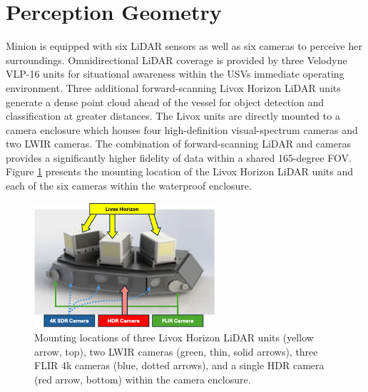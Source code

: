 \documentclass{erauthesis}
\begin{document}
\section{Perception Geometry} \label{perception_geometry}

Minion is equipped with six \ac{LiDAR} sensors as well as six cameras to perceive her surroundings.
Omnidirectional \ac{LiDAR} coverage is provided by three Velodyne VLP-16 units for situational awareness within the \acp{USV} immediate operating environment.
Three additional forward-scanning Livox Horizon \ac{LiDAR} units generate a dense point cloud ahead of the vessel for object detection and classification at greater distances.
The Livox units are directly mounted to a camera enclosure which houses four high-definition visual-spectrum cameras and two \ac{LWIR} cameras.
The combination of forward-scanning LiDAR and cameras provides a significantly higher fidelity of data within a shared 165-degree \ac{FOV}. %
Figure \ref{fig:camera_enclosure} presents the mounting location of the Livox Horizon LiDAR units and each of the six cameras within the waterproof enclosure. 

\begin{figure}[htbp]
\centering
\includegraphics[width=0.6\textwidth]{Images/Camera_enclosure2.png}
\caption{Mounting locations of three Livox Horizon LiDAR units (yellow arrow, top), two LWIR cameras (green, thin, solid arrows), three FLIR 4k cameras (blue, dotted arrows), and a single \ac{HDR} camera  (red arrow, bottom) within the camera enclosure.}
\label{fig:camera_enclosure}
\end{figure}
\end{document}
